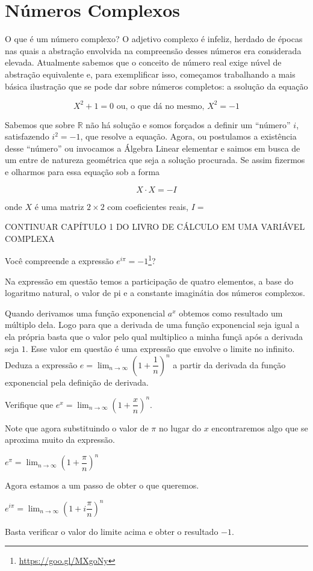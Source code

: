 \section{Números Complexos}
O que é um número complexo? O adjetivo complexo é infeliz, herdado de épocas nas quais a abstração envolvida na compreensão desses números era considerada elevada. Atualmente sabemos que o conceito de número real exige núvel de abstração equivalente e, para exemplificar isso, começamos trabalhando a mais básica ilustração que se pode dar sobre números completos: a ssolução da equação

$$X^2+1=0 \mbox{ ou, o que dá no mesmo, } X^2=-1$$

Sabemos que sobre $\mathbb{R}$ não há solução e somos forçados a definir um ``número'' $i$, satisfazendo $i^2=-1$, que resolve a equação. Agora, ou postulamos a existência desse ``número'' ou invocamos a Álgebra Linear elementar e saimos em busca de um entre de natureza geométrica que seja a solução procurada. Se assim fizermos e olharmos para essa equação sob a forma

$$X \cdot X = -I$$

onde $X$ é uma matriz $2 \times 2$ com coeficientes reais, $I=$

CONTINUAR CAPÍTULO 1 DO LIVRO DE CÁLCULO EM UMA VARIÁVEL COMPLEXA


Você compreende a expressão $e^{i\pi}=-1$\footnote{\url{https://goo.gl/MXgoNy}}?

Na expressão em questão temos a participação de quatro elementos, a base do logaritmo natural, o valor de pi e a constante imaginátia dos números complexos.

Quando derivamos uma função exponencial $a^x$ obtemos como resultado um múltiplo dela. Logo para que a derivada de uma função exponencial seja igual a ela própria basta que o valor pelo qual multiplico a minha funçã após a derivada seja $1$. Esse valor em questão é uma expressão que envolve o limite no infinito. Deduza a expressão $e=\lim_{n \to \infty} \left( 1+\dfrac{1}{n} \right)^n$ a partir da derivada da função exponencial pela definição de derivada.

Verifique que $e^x=\lim_{n \to \infty} \left( 1+\dfrac{x}{n} \right)^n$.

Note que agora substituindo o valor de $\pi$ no lugar do $x$ encontraremos algo que se aproxima muito da expressão.

$e^{\pi}=\lim_{n \to \infty} \left( 1+\dfrac{\pi}{n} \right)^n$

Agora estamos a um passo de obter o que queremos.

$e^{i\pi}=\lim_{n \to \infty} \left( 1+i\dfrac{\pi}{n} \right)^n$

Basta verificar o valor do limite acima e obter o resultado $-1$.


